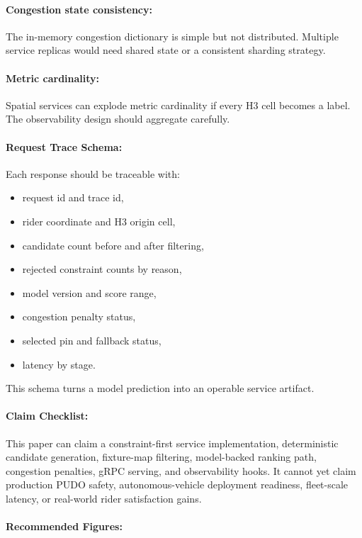 \documentclass{article}
\begin{document}
\paragraph{Congestion state consistency:}
The in-memory congestion dictionary is simple but not distributed. Multiple service replicas would need shared state or a consistent sharding strategy.

\paragraph{Metric cardinality:}
Spatial services can explode metric cardinality if every H3 cell becomes a label. The observability design should aggregate carefully.

\paragraph{Request Trace Schema:}

Each response should be traceable with:
\begin{itemize}
  \item request id and trace id,
  \item rider coordinate and H3 origin cell,
  \item candidate count before and after filtering,
  \item rejected constraint counts by reason,
  \item model version and score range,
  \item congestion penalty status,
  \item selected pin and fallback status,
  \item latency by stage.
\end{itemize}
This schema turns a model prediction into an operable service artifact.

\paragraph{Claim Checklist:}

This paper can claim a constraint-first service implementation, deterministic candidate generation, fixture-map filtering, model-backed ranking path, congestion penalties, gRPC serving, and observability hooks. It cannot yet claim production PUDO safety, autonomous-vehicle deployment readiness, fleet-scale latency, or real-world rider satisfaction gains.

\paragraph{Recommended Figures:}
\end{document}
